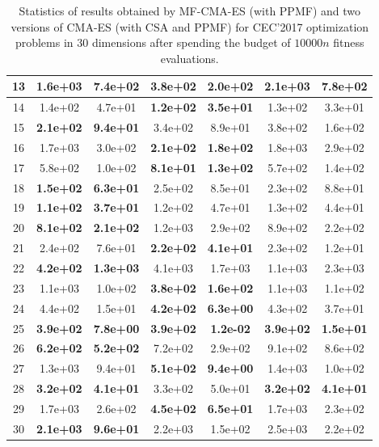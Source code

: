 \documentclass[dvipsnames,format=sigconf,anonymous=false,review=false]{acmart}
\begin{document}
\begin{table}[t!]
{\begin{tabular}{c|c|c|c|c|c|c}
\hline
13 & 1.6e+03 & 7.4e+02 & \textbf{3.8e+02} & \textbf{2.0e+02} & 2.1e+03 & 7.8e+02\\
\hline
14 & 1.4e+02 & 4.7e+01 & \textbf{1.2e+02} & \textbf{3.5e+01} & 1.3e+02 & 3.3e+01\\
\hline
15 & \textbf{2.1e+02} & \textbf{9.4e+01} & 3.4e+02 & 8.9e+01 & 3.8e+02 & 1.6e+02\\
\hline
16 & 1.7e+03 & 3.0e+02 & \textbf{2.1e+02} & \textbf{1.8e+02} & 1.8e+03 & 2.9e+02\\
\hline
17 & 5.8e+02 & 1.0e+02 & \textbf{8.1e+01} & \textbf{1.3e+02} & 5.7e+02 & 1.4e+02\\
\hline
18 & \textbf{1.5e+02} & \textbf{6.3e+01} & 2.5e+02 & 8.5e+01 & 2.3e+02 & 8.8e+01\\
\hline
19 & \textbf{1.1e+02} & \textbf{3.7e+01} & 1.2e+02 & 4.7e+01 & 1.3e+02 & 4.4e+01\\
\hline
20 & \textbf{8.1e+02} & \textbf{2.1e+02} & 1.2e+03 & 2.9e+02 & 8.9e+02 & 2.2e+02\\
\hline
21 & 2.4e+02 & 7.6e+01 & \textbf{2.2e+02} & \textbf{4.1e+01} & 2.3e+02 & 1.2e+01\\
\hline
22 & \textbf{4.2e+02} & \textbf{1.3e+03} & 4.1e+03 & 1.7e+03 & 1.1e+03 & 2.3e+03\\
\hline
23 & 1.1e+03 & 1.0e+02 & \textbf{3.8e+02} & \textbf{1.6e+02} & 1.1e+03 & 1.1e+02\\
\hline
24 & 4.4e+02 & 1.5e+01 & \textbf{4.2e+02} & \textbf{6.3e+00} & 4.3e+02 & 3.7e+01\\
\hline
25 & \textbf{3.9e+02} & \textbf{7.8e+00} & \textbf{3.9e+02} & \textbf{1.2e-02} & \textbf{3.9e+02} & \textbf{1.5e+01}\\
\hline
26 & \textbf{6.2e+02} & \textbf{5.2e+02} & 7.2e+02 & 2.9e+02 & 9.1e+02 & 8.6e+02\\
\hline
27 & 1.3e+03 & 9.4e+01 & \textbf{5.1e+02} & \textbf{9.4e+00} & 1.4e+03 & 1.0e+02\\
\hline
28 & \textbf{3.2e+02} & \textbf{4.1e+01} & 3.3e+02 & 5.0e+01 & \textbf{3.2e+02} & \textbf{4.1e+01}\\
\hline
29 & 1.7e+03 & 2.6e+02 & \textbf{4.5e+02} & \textbf{6.5e+01} & 1.7e+03 & 2.3e+02\\
\hline
30 & \textbf{2.1e+03} & \textbf{9.6e+01} & 2.2e+03 & 1.5e+02 & 2.5e+03 & 2.2e+02\\
\bottomrule
\end{tabular}
}
\caption{Statistics of results obtained by MF-CMA-ES (with PPMF) and two versions of CMA-ES (with CSA and PPMF) for CEC'2017 optimization problems in 30 dimensions after spending the budget of $10000n$ fitness evaluations.}
\label{tab:CEC17-D30}
\end{table}
\end{document}
